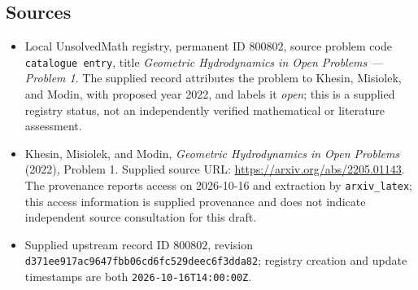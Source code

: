 \documentclass[11pt]{article}
\begin{document}
\subsection{Sources}
\begin{itemize}
\item Local UnsolvedMath registry, permanent ID \(800802\), source problem code \texttt{catalogue entry}, title \emph{Geometric Hydrodynamics in Open Problems --- Problem 1}. The supplied record attributes the problem to Khesin, Misiolek, and Modin, with proposed year 2022, and labels it \emph{open}; this is a supplied registry status, not an independently verified mathematical or literature assessment.
\item Khesin, Misiolek, and Modin, \emph{Geometric Hydrodynamics in Open Problems} (2022), Problem 1. Supplied source URL: \url{https://arxiv.org/abs/2205.01143}. The provenance reports access on 2026-10-16 and extraction by \texttt{arxiv\_latex}; this access information is supplied provenance and does not indicate independent source consultation for this draft.
\item Supplied upstream record ID \(800802\), revision \texttt{d371ee917ac9647fbb06cd6fc529deec6f3dda82}; registry creation and update timestamps are both \texttt{2026-10-16T14:00:00Z}.
\end{itemize}
\end{document}
